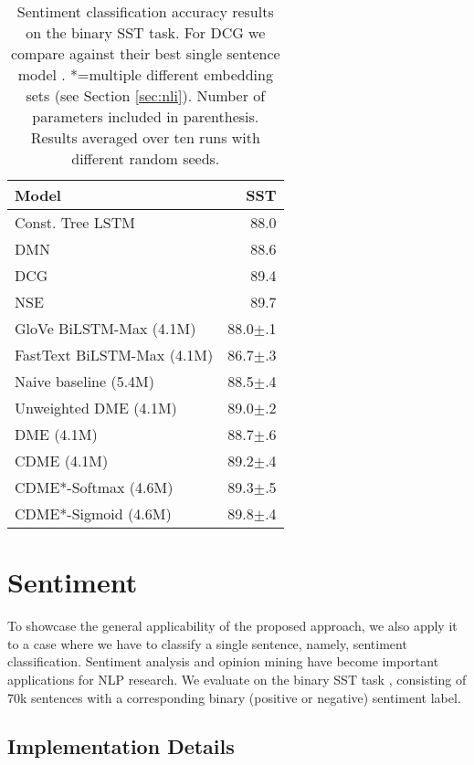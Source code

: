 \documentclass[11pt,a4paper]{article}
\begin{document}
\begin{table}[t]
  \centering
  \begin{tabular}{lr}
    \toprule
    Model & SST\\
    \midrule
    Const. Tree LSTM \cite{Tai:2015arxiv} & 88.0\\
    DMN \cite{Kumar:2016icml} & 88.6\\
    DCG \cite{Looks:2017arxiv} & 89.4\\
    NSE \cite{Munkhdalai:2017acl} & 89.7\\
    \midrule
    GloVe BiLSTM-Max {\small (4.1M)} & 88.0$\pm$.1\\
	FastText BiLSTM-Max {\small (4.1M)} & 86.7$\pm$.3\\
    Naive baseline {\small (5.4M)} & 88.5$\pm$.4\\\midrule
    Unweighted DME {\small (4.1M)} & 89.0$\pm$.2\\
    DME {\small (4.1M)} & 88.7$\pm$.6\\
    CDME {\small (4.1M)} & 89.2$\pm$.4\\\midrule
    CDME*-Softmax {\small (4.6M)} & 89.3$\pm$.5\\
	CDME*-Sigmoid {\small (4.6M)} & 89.8$\pm$.4\\
    \bottomrule
  \end{tabular}
  \caption{\label{table:sentiment}Sentiment classification accuracy results on the binary SST task. For DCG we compare against their best single sentence model \cite{Looks:2017arxiv}. *=multiple different embedding sets (see Section \ref{sec:nli}). Number of parameters included in parenthesis. Results averaged over ten runs with different random seeds.}
\end{table}
  
\section{Sentiment}
\label{sec:sst}

To showcase the general applicability of the proposed approach, we also apply it to a case where we have to classify a single sentence, namely, sentiment classification. Sentiment analysis and opinion mining have become important applications for NLP research. We evaluate on the binary SST task \cite{Socher:2013emnlp}, consisting of 70k sentences with a corresponding binary (positive or negative) sentiment label.

\subsection{Implementation Details}
\end{document}
